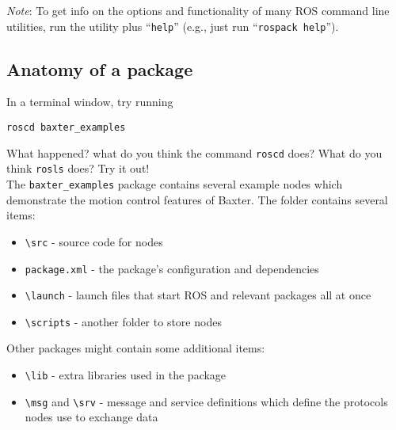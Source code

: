 \documentclass{article}
\begin{document}
\emph{Note}: To get info on the options and functionality of many ROS command line utilities, run the utility plus ``\verb=help='' (e.g., just run ``\verb=rospack help='').

\subsection{Anatomy of a package}
In a terminal window, try running
\begin{Verbatim}[frame=single]
roscd baxter_examples
\end{Verbatim}
What happened? what do you think the command \verb=roscd= does? What do you think \verb=rosls= does? Try it out!\\

The \verb=baxter_examples= package contains several example nodes which demonstrate the motion control features of Baxter. The folder contains several items:
\begin{itemize}
    \setlength\itemsep{0pt}
    \item \verb=\src= - source code for nodes
    \item \verb=package.xml= - the package's configuration and dependencies
    \item \verb=\launch= - launch files that start ROS and relevant packages all at once
    \item \verb=\scripts= - another folder to store nodes
\end{itemize}

\begin{samepage}
Other packages might contain some additional items:
\begin{itemize}
    \item \verb=\lib= - extra libraries used in the package
    \item \verb=\msg= and \verb=\srv= - message and service definitions which define the protocols nodes use to exchange data
\end{itemize}
\end{samepage}
\end{document}

